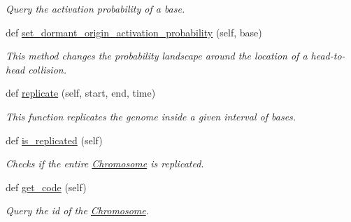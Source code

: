 \begin{DoxyCompactItemize}
\begin{DoxyCompactList}\small\item\em Query the activation probability of a base. \end{DoxyCompactList}\item 
def \mbox{\hyperlink{classReDyMo_1_1src_1_1chromosome_1_1Chromosome_a693010ebf7c4b74df6b1a70f39ab245d}{set\+\_\+dormant\+\_\+origin\+\_\+activation\+\_\+probability}} (self, base)
\begin{DoxyCompactList}\small\item\em This method changes the probability landscape around the location of a head-\/to-\/head collision. \end{DoxyCompactList}\item 
def \mbox{\hyperlink{classReDyMo_1_1src_1_1chromosome_1_1Chromosome_aac8462677b62589ca8f103c047c5c014}{replicate}} (self, start, end, time)
\begin{DoxyCompactList}\small\item\em This function replicates the genome inside a given interval of bases. \end{DoxyCompactList}\item 
def \mbox{\hyperlink{classReDyMo_1_1src_1_1chromosome_1_1Chromosome_af22490836eb322b1dc55eaf10d14c7bb}{is\+\_\+replicated}} (self)
\begin{DoxyCompactList}\small\item\em Checks if the entire \mbox{\hyperlink{classReDyMo_1_1src_1_1chromosome_1_1Chromosome}{Chromosome}} is replicated. \end{DoxyCompactList}\item 
def \mbox{\hyperlink{classReDyMo_1_1src_1_1chromosome_1_1Chromosome_a8fc8b953b0ba394a0dfc80fcdbcd274e}{get\+\_\+code}} (self)
\begin{DoxyCompactList}\small\item\em Query the id of the \mbox{\hyperlink{classReDyMo_1_1src_1_1chromosome_1_1Chromosome}{Chromosome}}. \end{DoxyCompactList}\end{DoxyCompactItemize}
